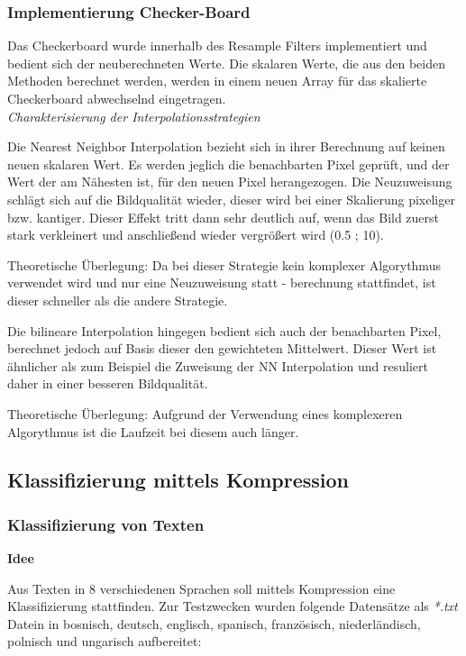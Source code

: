\documentclass[12pt,german]{article}
\begin{document}
\subsubsection{Implementierung Checker-Board}

Das Checkerboard wurde innerhalb des Resample Filters implementiert und bedient sich der neuberechneten Werte. Die skalaren Werte, die aus den beiden Methoden berechnet werden, werden in einem neuen Array für das skalierte Checkerboard abwechselnd eingetragen.\\

\textit{Charakterisierung der Interpolationsstrategien}

Die Nearest Neighbor Interpolation bezieht sich in ihrer Berechnung auf keinen neuen skalaren Wert. Es werden jeglich die benachbarten Pixel geprüft, und der Wert der am Nähesten ist, für den neuen Pixel herangezogen. Die Neuzuweisung schlägt sich auf die Bildqualität wieder, dieser wird bei einer Skalierung pixeliger bzw. kantiger. Dieser Effekt tritt dann sehr deutlich auf, wenn das Bild zuerst stark verkleinert und anschließend wieder vergrößert wird (0.5 ; 10).

Theoretische Überlegung: Da bei dieser Strategie kein komplexer Algorythmus verwendet wird und nur eine Neuzuweisung statt - berechnung stattfindet, ist dieser schneller als die andere Strategie.

Die bilineare Interpolation hingegen bedient sich auch der benachbarten Pixel, berechnet jedoch auf Basis dieser den gewichteten Mittelwert. Dieser Wert ist ähnlicher als zum Beispiel die Zuweisung der NN Interpolation und resuliert daher in einer besseren Bildqualität. 

Theoretische Überlegung: Aufgrund der Verwendung eines komplexeren Algorythmus ist die Laufzeit bei diesem auch länger.

 \subsection{Klassifizierung mittels Kompression}
\subsubsection{Klassifizierung von Texten}

\textbf{Idee}

Aus Texten in 8 verschiedenen Sprachen soll mittels Kompression eine Klassifizierung stattfinden. Zur Testzwecken wurden folgende Datensätze als \textit{ *.txt}  Datein in bosnisch, deutsch, englisch, spanisch, französisch, niederländisch, polnisch und ungarisch aufbereitet:
\end{document}
